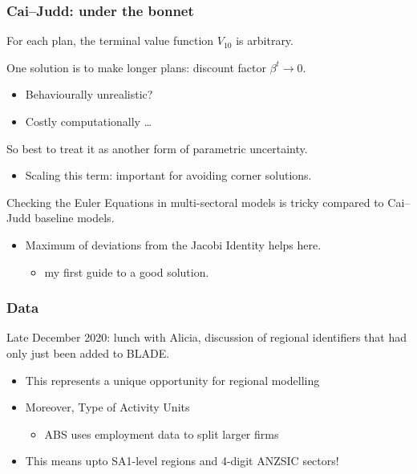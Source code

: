 \documentclass[handout,english]{beamer}
\begin{document}
\begin{frame}
  \frametitle{Cai--Judd: under the bonnet}
  For each plan, the terminal value function $V_{10}$ is arbitrary.

  One solution is to make longer plans: discount factor 
    $\beta^t \rightarrow 0$.
    \begin{itemize}
      \item Behaviourally unrealistic?
      \item Costly computationally \dots
    \end{itemize}
  So best to treat it as another form of parametric uncertainty.
    \begin{itemize}
      \item Scaling this term: important for avoiding corner solutions.
    \end{itemize}
  Checking the Euler Equations in multi-sectoral models is tricky compared to
  Cai--Judd baseline models.
    \begin{itemize}
      \item Maximum of deviations from the Jacobi Identity helps here.
        \begin{itemize}
          \item my first guide to a good solution.
        \end{itemize}
    \end{itemize}
\end{frame}
\begin{frame}
  \frametitle{Data}
  Late December 2020: lunch with Alicia, discussion of regional
  identifiers that had only just been added to BLADE.
  \begin{itemize}
    \item This represents a unique opportunity for regional modelling
    \item Moreover, Type of Activity Units
      \begin{itemize}
        \item ABS uses employment data to split larger firms
      \end{itemize}
    \item This means upto SA1-level regions and 4-digit ANZSIC sectors!
  \end{itemize}

\end{frame}
\end{document}
